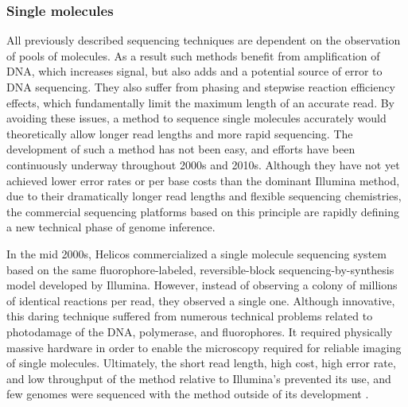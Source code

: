 \subsubsection{Single molecules}

All previously described sequencing techniques are dependent on the observation of pools of molecules.
As a result such methods benefit from amplification of DNA, which increases signal, but also adds and a potential source of error to DNA sequencing.
They also suffer from phasing and stepwise reaction efficiency effects, which fundamentally limit the maximum length of an accurate read.
By avoiding these issues, a method to sequence single molecules accurately would theoretically allow longer read lengths and more rapid sequencing.
The development of such a method has not been easy, and efforts have been continuously underway throughout 2000s and 2010s.
Although they have not yet achieved lower error rates or per base costs than the dominant Illumina method, due to their dramatically longer read lengths and flexible sequencing chemistries, the commercial sequencing platforms based on this principle are rapidly defining a new technical phase of genome inference.

In the mid 2000s, Helicos commercialized a single molecule sequencing system based on the same fluorophore-labeled, reversible-block sequencing-by-synthesis model developed by Illumina.
However, instead of observing a colony of millions of identical reactions per read, they observed a single one.
Although innovative, this daring technique suffered from numerous technical problems related to photodamage of the DNA, polymerase, and fluorophores.
It required physically massive hardware in order to enable the microscopy required for reliable imaging of single molecules.
Ultimately, the short read length, high cost, high error rate, and low throughput of the method relative to Illumina's prevented its use, and few genomes were sequenced with the method outside of its development \cite{harris2008single}.

